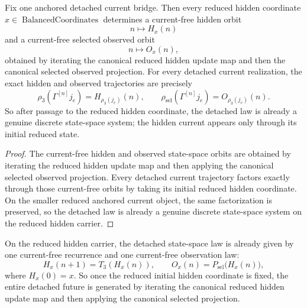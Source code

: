 \begin{corollary}
\label{thm:current-free-state-space-form-of-the-detached-dynamics}
Fix one anchored detached current bridge. Then every reduced hidden coordinate
\(x \in \operatorname{BalancedCoordinates}\) determines a current-free hidden
orbit
\[
n \longmapsto H_x(n)
\]
and a current-free selected observed orbit
\[
n \longmapsto O_x(n),
\]
obtained by iterating the canonical reduced hidden update map and then the
canonical selected observed projection. For every detached current realization,
the exact hidden and observed trajectories are precisely
\[
\rho_3(\Gamma^{[n]} j_e)=H_{\rho_3(j_e)}(n),
\qquad
\rho_{\mathrm{sel}}(\Gamma^{[n]} j_e)=O_{\rho_3(j_e)}(n).
\]
So after passage to the reduced hidden coordinate, the detached law is already
a genuine discrete state-space system; the hidden current appears only through
its initial reduced state.
\end{corollary}

\begin{proof}
The current-free hidden and observed state-space orbits are obtained by
iterating the reduced hidden update map and then applying the canonical
selected observed projection. Every detached current trajectory factors exactly
through those current-free orbits by taking its initial reduced hidden
coordinate. On the smaller reduced anchored current object, the same
factorization is preserved, so the detached law is already a genuine discrete
state-space system on the reduced hidden carrier.
\end{proof}

\begin{corollary}
\label{thm:current-free-recurrence-form-on-the-reduced-hidden-carrier}
On the reduced hidden carrier, the detached state-space law is already given by
one current-free recurrence and one current-free observation law:
\[
H_x(n+1)=T_3(H_x(n)),
\qquad
O_x(n)=P_{\mathrm{sel}}\!\bigl(H_x(n)\bigr),
\]
where \(H_x(0)=x\). So once the reduced initial hidden coordinate is fixed, the
entire detached future is generated by iterating the canonical reduced hidden
update map and then applying the canonical selected projection.
\end{corollary}

